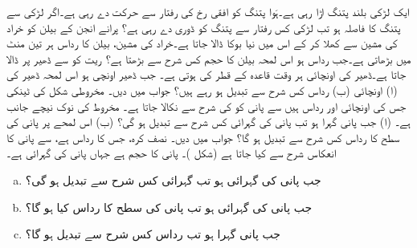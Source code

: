 ایک لڑکی  بلند پتنگ  اڑا رہی ہے۔ہَوا پتنگ کو افقی رخ  کی رفتار سے حرکت دے رہی ہے۔اگر لڑکی سے پتنگ کا فاصلہ  ہو تب لڑکی کس رفتار سے پتنگ کو ڈوری دے رہی ہے؟ 
پرانے انجن کے  بیلن کو خراد کی مشین سے کھلا کر کے اس میں نیا بوکا ڈالا جاتا ہے۔خراد کی مشین، بیلن کا رداس ہر تین منٹ میں  بڑھاتی ہے۔جب رداس  ہو اس لمحہ بیلن کا حجم کس شرح سے بڑھتا ہے؟
ریت کو  سے  ڈھیر  پر ڈالا جاتا ہے۔ڈھیر کی اونچائی ہر وقت قاعدہ کے قطر کی  ہوتی ہے۔ جب ڈھیر  اونچی  ہو اس لمحہ ڈھیر کی (ا) اونچائی (ب) رداس کس شرح سے تبدیل ہو رہے ہیں؟  جواب  میں دیں۔ 
مخروطی شکل کی ٹینکی جس کی اونچائی  اور رداس  ہیں سے پانی  کو  کی شرح سے نکالا جاتا ہے۔ مخروط کی نوک نیچے جانب ہے۔ (ا) جب پانی  گہرا ہو تب پانی کی گہرائی کس شرح سے تبدیل ہو گی؟ (ب) اس لمحے پر پانی کی سطح کا رداس کس شرح سے تبدیل ہو گا؟ جواب  میں دیں۔
نصف کرہ، جس کا رداس  ہے،  سے پانی کا انعکاس    شرح سے کیا جاتا ہے (شکل )۔ پانی کا حجم  ہے جہاں  پانی کی گہرائی ہے۔
%
\begin{enumerate}[a.]
\item
جب پانی کی گہرائی  ہو تب گہرائی کس شرح سے تبدیل ہو گی؟
\item
جب پانی کی گہرائی  ہو تب پانی کی سطح کا رداس کیا ہو گا؟
\item
جب پانی  گہرا ہو تب رداس کس شرح سے تبدیل ہو گا؟
\end{enumerate}
